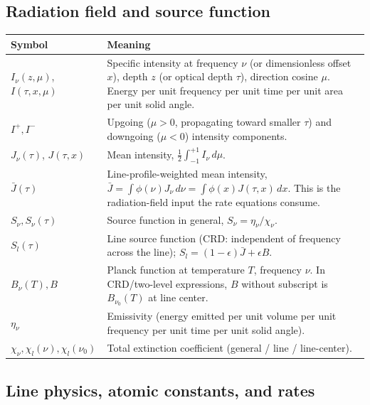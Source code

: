 \documentclass[11pt]{article}
\newcommand{\Jbar}{\bar{J}}
\newcommand{\Sl}{S_{l}}
\begin{document}
\subsection*{Radiation field and source function}

\noindent\begin{tabular}{@{}p{1.4in}p{4.8in}@{}}
\toprule
\textbf{Symbol} & \textbf{Meaning} \\ \midrule
$I_\nu(z, \mu)$, $I(\tau, x, \mu)$ & Specific intensity at frequency $\nu$ (or dimensionless offset $x$), depth $z$ (or optical depth $\tau$), direction cosine $\mu$.  Energy per unit frequency per unit time per unit area per unit solid angle. \\
$I^+, I^-$ & Upgoing ($\mu > 0$, propagating toward smaller $\tau$) and downgoing ($\mu < 0$) intensity components. \\
$J_\nu(\tau)$, $J(\tau, x)$ & Mean intensity, $\tfrac{1}{2}\int_{-1}^{+1} I_\nu \, d\mu$. \\
$\Jbar(\tau)$ & Line-profile-weighted mean intensity, $\Jbar = \int \phi(\nu) J_\nu \, d\nu = \int \phi(x) J(\tau, x) \, dx$.  This is the radiation-field input the rate equations consume. \\
$S_\nu, S_\nu(\tau)$ & Source function in general, $S_\nu = \eta_\nu / \chi_\nu$. \\
$\Sl(\tau)$ & Line source function (CRD: independent of frequency across the line); $\Sl = (1-\epsilon) \Jbar + \epsilon B$. \\
$B_\nu(T), B$ & Planck function at temperature $T$, frequency $\nu$.  In CRD/two-level expressions, $B$ without subscript is $B_{\nu_0}(T)$ at line center. \\
$\eta_\nu$ & Emissivity (energy emitted per unit volume per unit frequency per unit time per unit solid angle). \\
$\chi_\nu, \chi_l(\nu), \chi_l(\nu_0)$ & Total extinction coefficient (general / line / line-center). \\
\bottomrule
\end{tabular}

\subsection*{Line physics, atomic constants, and rates}
\end{document}
